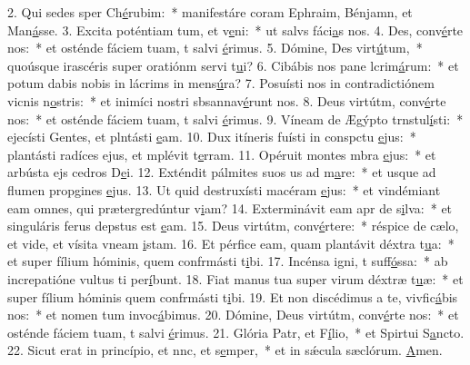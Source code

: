 2. Qui sedes sper Ch\uline{é}rubim:~* manifestáre coram Ephraim, Bénjamn, et Man\uline{á}sse.
3. Excita poténtiam tum, et v\uline{e}ni:~* ut salvs fáci\uline{a}s nos.
4. Des, conv\uline{é}rte nos:~* et osténde fáciem tuam, t salvi \uline{é}rimus.
5. Dómine, Des virt\uline{ú}tum,~* quoúsque irascéris super oratiónm servi t\uline{u}i?
6. Cibábis nos pane lcrim\uline{á}rum:~* et potum dabis nobis in lácrims in mens\uline{ú}ra?
7. Posuísti nos in contradictiónem vicnis n\uline{o}stris:~* et inimíci nostri sbsannav\uline{é}runt nos.
8. Deus virtútm, conv\uline{é}rte nos:~* et osténde fáciem tuam, t salvi \uline{é}rimus.
9. Víneam de Ægýpto trnstul\uline{í}sti:~* ejecísti Gentes, et plntásti \uline{e}am.
10. Dux itíneris fuísti in conspctu \uline{e}jus:~* plantásti radíces ejus, et mplévit t\uline{e}rram.
11. Opéruit montes mbra \uline{e}jus:~* et arbústa ejs cedros D\uline{e}i.
12. Exténdit pálmites suos us ad m\uline{a}re:~* et usque ad flumen propgines \uline{e}jus.
13. Ut quid destruxísti macéram \uline{e}jus:~* et vindémiant eam omnes, qui prætergredúntur v\uline{i}am?
14. Exterminávit eam apr de s\uline{i}lva:~* et singuláris ferus depstus est \uline{e}am.
15. Deus virtútm, conv\uline{é}rtere:~* réspice de cælo, et vide, et vísita vneam \uline{i}stam.
16. Et pérfice eam, quam plantávit déxtra t\uline{u}a:~* et super fílium hóminis, quem confrmásti t\uline{i}bi.
17. Incénsa igni, t suff\uline{ó}ssa:~* ab increpatióne vultus ti per\uline{í}bunt.
18. Fiat manus tua super virum déxtræ t\uline{u}æ:~* et super fílium hóminis quem confrmásti t\uline{i}bi.
19. Et non discédimus a te, vivfic\uline{á}bis nos:~* et nomen tum invoc\uline{á}bimus.
20. Dómine, Deus virtútm, conv\uline{é}rte nos:~* et osténde fáciem tuam, t salvi \uline{é}rimus.
21. Glória Patr, et F\uline{í}lio,~* et Spirtui S\uline{a}ncto.
22. Sicut erat in princípio, et nnc, et s\uline{e}mper,~* et in sǽcula sæclórum. \uline{A}men.
